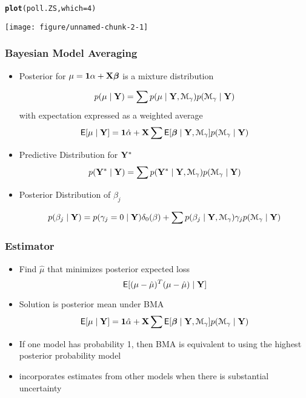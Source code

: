 \documentclass{beamer}\usepackage[]{graphicx}\usepackage[]{color}
\makeatletter
\def\maxwidth{ %
  \ifdim\Gin@nat@width>\linewidth
    \linewidth
  \else
    \Gin@nat@width
  \fi
}
\newcommand{\hlnum}[1]{\textcolor[rgb]{0.686,0.059,0.569}{#1}}%
\newcommand{\hlstd}[1]{\textcolor[rgb]{0.345,0.345,0.345}{#1}}%
\newcommand{\hlkwc}[1]{\textcolor[rgb]{0.333,0.667,0.333}{#1}}%
\newcommand{\hlkwd}[1]{\textcolor[rgb]{0.737,0.353,0.396}{\textbf{#1}}}%
\newenvironment{kframe}{%
 \def\at@end@of@kframe{}%
 \ifinner\ifhmode%
  \def\at@end@of@kframe{\end{minipage}}%
  \begin{minipage}{\columnwidth}%
 \fi\fi%
 \def\FrameCommand##1{\hskip\@totalleftmargin \hskip-\fboxsep
 \colorbox{shadecolor}{##1}\hskip-\fboxsep
     \hskip-\linewidth \hskip-\@totalleftmargin \hskip\columnwidth}%
 \MakeFramed {\advance\hsize-\width
   \@totalleftmargin\z@ \linewidth\hsize
   \@setminipage}}%
 {\par\unskip\endMakeFramed%
 \at@end@of@kframe}
\newenvironment{knitrout}{}{} %
\makeatother
\begin{document}
\begin{frame}
\begin{knitrout}
\color{fgcolor}\begin{kframe}
\begin{alltt}
\hlkwd{plot}\hlstd{(poll.ZS,} \hlkwc{which}\hlstd{=}\hlnum{4}\hlstd{)}
\end{alltt}
\end{kframe}

{\centering \texttt{[image: figure/unnamed-chunk-2-1]} 

}



\end{knitrout}
\end{frame}

\begin{frame} \frametitle{Bayesian Model Averaging}

\begin{itemize}
\item Posterior for $\mu = \mathbf{1} \alpha + \mathbf{X} \boldsymbol{\beta}$ is a mixture distribution

$$p(\mu \mid \mathbf{Y}) = \sum p(\mu \mid \mathbf{Y}, {\cal M}_\gamma) p({\cal M}_\gamma \mid \mathbf{Y})$$ \pause
with expectation expressed as a weighted average
$$\textsf{E}[\mu \mid \mathbf{Y}] = \mathbf{1} \hat{\alpha} +  \mathbf{X} \sum \textsf{E}[\boldsymbol{\beta} \mid \mathbf{Y}, {\cal M}_\gamma] p({\cal M}_\gamma \mid \mathbf{Y})$$
\pause
\item Predictive Distribution for $\mathbf{Y}^*$
$$p(\mathbf{Y}^* \mid \mathbf{Y}) = \sum p(\mathbf{Y}^* \mid \mathbf{Y}, {\cal M}_\gamma) p({\cal M}_\gamma \mid \mathbf{Y})$$
\pause
\item Posterior Distribution of $\beta_j$

$$p(\beta_j \mid \mathbf{Y}) = p(\gamma_j = 0 \mid \mathbf{Y}) \delta_0(\beta) + \sum p(\beta_j \mid \mathbf{Y}, {\cal M}_\gamma) \gamma_j p({\cal M}_\gamma \mid \mathbf{Y}) $$
\end{itemize}

\end{frame}

\begin{frame} \frametitle{Estimator}

\begin{itemize}
\item Find $\hat{\mu}$ that minimizes posterior expected loss
$$\textsf{E}[(\mu - \hat{\mu})^T(\mu - \hat{\mu}) \mid \mathbf{Y}]$$ \pause
\item Solution is posterior mean under BMA
$$\textsf{E}[\mu \mid \mathbf{Y}] = \mathbf{1} \hat{\alpha} +  \mathbf{X} \sum \textsf{E}[\boldsymbol{\beta} \mid \mathbf{Y}, {\cal M}_\gamma] p({\cal M}_\gamma \mid \mathbf{Y})$$ \pause
\item If one model has probability 1, then BMA is equivalent to using the highest posterior probability model \pause
\item incorporates estimates from other models when there is substantial uncertainty
\end{itemize}

\end{frame}
\end{document}
